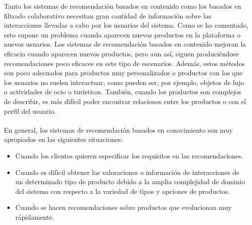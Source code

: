 \documentclass[11pt,a4paper]{article}
\begin{document}
		 Tanto los sistemas de recomendación basados en contenido como los basados en filtrado colaborativo necesitan gran cantidad de información sobre las interacciones llevadas a cabo por los usuarios del sistema. Como se ha comentado, esto supone un problema cuando aparecen nuevos productos en la plataforma o nuevos usuarios. Los sistemas de recomendación basados en contenido mejoran la eficacia cuando aparecen nuevos productos, pero aun así, siguen produciéndose recomendaciones poco eficaces en este tipo de escenarios. Además, estos métodos son poco adecuados para productos muy personalizados o productos con los que los usuarios no suelen interactuar, como pueden ser, por ejemplo, objetos de lujo o actividades de ocio o turísticas. También, cuando los productos son complejos de describir, es más difícil poder encontrar relaciones entre los productos o con el perfil del usuario.\\
		 \\
		 En general, los sistemas de recomendación basados en conocimiento son muy apropiados en las siguientes situaciones: 
		 
		 \begin{itemize}
		 	\item Cuando los clientes quieren especificar los requisitos en las recomendaciones. 
		 	\item Cuando es difícil obtener las valoraciones o información de interacciones de un determinado tipo de producto debido a la amplia complejidad de dominio del sistema con respecto a la variedad de tipos y opciones de productos. 
		 	\item Cuando se hacen recomendaciones sobre productos que evolucionan muy rápidamente.
		 \end{itemize}

	 	
	 	
	 		
\end{document}
